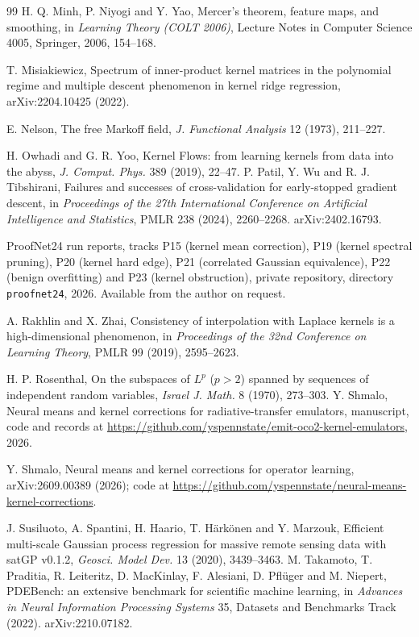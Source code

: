 \documentclass[11pt]{article}
\theoremstyle{definition}
\begin{document}
\begin{thebibliography}{99}
 H. Q. Minh, P. Niyogi and Y. Yao, Mercer's theorem, feature maps, and
smoothing, in \emph{Learning Theory (COLT 2006)}, Lecture Notes in Computer Science 4005, Springer,
2006, 154--168.

 T. Misiakiewicz, Spectrum of inner-product kernel matrices in the polynomial
regime and multiple descent phenomenon in kernel ridge regression, arXiv:2204.10425 (2022).


 E. Nelson, The free Markoff field, \emph{J. Functional Analysis} 12 (1973), 211--227.

 H. Owhadi and G. R. Yoo, Kernel Flows: from learning kernels from data into the abyss, \emph{J. Comput. Phys.} 389 (2019), 22--47.
 P. Patil, Y. Wu and R. J. Tibshirani, Failures and successes of cross-validation
for early-stopped gradient descent, in \emph{Proceedings of the 27th International Conference on
Artificial Intelligence and Statistics}, PMLR 238 (2024), 2260--2268. arXiv:2402.16793.

 ProofNet24 run reports, tracks P15 (kernel mean correction), P19 (kernel spectral
pruning), P20 (kernel hard edge), P21 (correlated Gaussian equivalence), P22 (benign overfitting) and
P23 (kernel obstruction), private repository, directory \texttt{proofnet24}, 2026. Available
from the author on request.

 A. Rakhlin and X. Zhai, Consistency of interpolation with Laplace kernels is a
high-dimensional phenomenon, in \emph{Proceedings of the 32nd Conference on Learning Theory}, PMLR
99 (2019), 2595--2623.


 H. P. Rosenthal, On the subspaces of $L^p$ ($p>2$) spanned by sequences of independent random variables, \emph{Israel J. Math.} 8 (1970), 273--303.
 Y. Shmalo, Neural means and kernel corrections for radiative-transfer
emulators, manuscript, code and records at
\url{https://github.com/yspennstate/emit-oco2-kernel-emulators}, 2026.

 Y. Shmalo, Neural means and kernel corrections for operator learning,
arXiv:2609.00389 (2026); code at \url{https://github.com/yspennstate/neural-means-kernel-corrections}.


 J. Susiluoto, A. Spantini, H. Haario, T. H\"ark\"onen and Y. Marzouk, Efficient multi-scale Gaussian process regression for massive remote sensing data with satGP v0.1.2, \emph{Geosci. Model Dev.} 13 (2020), 3439--3463.
 M. Takamoto, T. Praditia, R. Leiteritz, D. MacKinlay, F. Alesiani, D. Pfl\"uger
and M. Niepert, PDEBench: an extensive benchmark for scientific machine learning, in \emph{Advances
in Neural Information Processing Systems} 35, Datasets and Benchmarks Track (2022).
arXiv:2210.07182.


\end{thebibliography}
\end{document}
